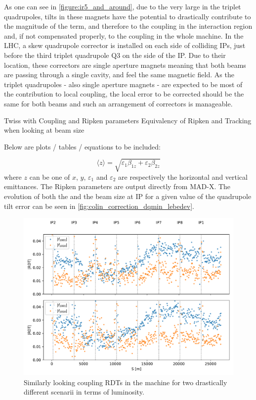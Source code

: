 As one can see in \cref{figure:ir5_and_around}, due to the very large \betafunctions in the triplet quadrupoles, tilts in these magnets have the potential to drastically contribute to the magnitude of the \foneohone term, and therefore to the coupling in the interaction region and, if not compensated properly, to the coupling in the whole machine.
In the LHC, a skew quadrupole corrector is installed on each side of colliding IPs, just before the third triplet quadrupole \(\mathrm{Q3}\) on the side of the IP.
Due to their location, these correctors are single aperture magnets meaning that both beams are passing through a single cavity, and feel the same magnetic field.
As the triplet quadrupoles - also single aperture magnets - are expected to be most of the contribution to local coupling, the local error to be corrected should be the same for both beams and such an arrangement of correctors is manageable.


Twiss with Coupling and Ripken parameters
Equivalency of Ripken and Tracking when looking at beam size

Below are plots / tables / equations to be included:

\begin{equation}
    \langle z \rangle = \sqrt{\varepsilon_{1} \beta_{1z} + \varepsilon_{2} \beta_{2z}}
    \label{equation:lebedev_beam_size}
\end{equation}
where \(z\) can be one of \(x\), \(y\), \(\varepsilon_{1}\) and \(\varepsilon_{2}\) are respectively the horizontal and vertical emittances.
The Ripken parameters are output directly from MAD-X.
The evolution of both the \AbsCminus and the beam size at IP for a given value of the quadrupole tilt error can be seen in \cref{fig:colin_correction_dqmin_lebedev}.

\begin{figure}
    \centering
    \includegraphics*[width=0.9\linewidth]{Figures/Chapter4/guess_rdts.pdf}
    \caption{Similarly looking coupling RDTs in the machine for two drastically different scenarii in terms of luminosity.}
    \label{figure:guess_rdts}
\end{figure}

